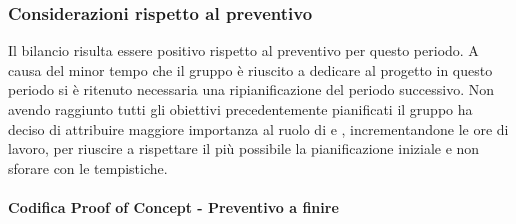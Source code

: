 \subsubsection{Considerazioni rispetto al preventivo} \label{subsubsection:considerazioni_finali_TB}
Il bilancio risulta essere positivo rispetto al preventivo per questo periodo.
A causa del minor tempo che il gruppo è riuscito a dedicare al progetto in questo periodo si è ritenuto necessaria una ripianificazione del periodo successivo.
Non avendo raggiunto tutti gli obiettivi precedentemente pianificati il gruppo ha deciso di attribuire maggiore importanza al ruolo di \roleDesignerLow{} e \roleProgrammerLow{}, incrementandone le ore di lavoro, per riuscire a rispettare il più possibile la pianificazione iniziale e non sforare con le tempistiche.

\paragraph{Codifica Proof of Concept - Preventivo a finire} \label{paragraph:preventivo_finire_Poc}

